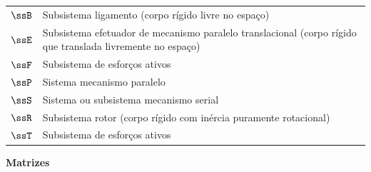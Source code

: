 \documentclass[]{politex}
\begin{document}
\begin{longtable}{lp{}}
  $\ssB$ & Subsistema ligamento (corpo rígido livre no espaço) \\
  $\ssE$ & Subsistema efetuador de mecanismo paralelo translacional (corpo rígido que translada livremente no espaço) \\
  $\ssF$ & Subsistema de esforços ativos \\
  $\ssP$ & Sistema mecanismo paralelo \\
  $\ssS$ & Sistema ou subsistema mecanismo serial \\
  $\ssR$ & Subsistema rotor (corpo rígido com inércia puramente rotacional) \\
  $\ssT$ & Subsistema de esforços ativos \\
\end{longtable}
\begin{center} \begin{Large} \textbf{Matrizes} \end{Large} \end{center}
\end{document}

